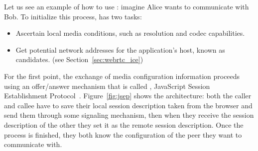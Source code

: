 Let us see an example of how to use \RTCPeerConnection: imagine Alice wants to communicate with Bob. To initialize this process, \RTCPeerConnection has two tasks:
\begin{itemize}
	\item Ascertain local media conditions, such as resolution and codec capabilities.
	\item Get potential network addresses for the application's host, known as candidates. (see Section~\ref{sec:webrtc_ice})
\end{itemize}

For the first point, the exchange of media configuration information proceeds using an offer/answer mechanism that is called \JSEP, JavaScript Session Establishment Protocol~\cite{jsep}. Figure~\ref{fig:jsep} shows the \JSEP architecture: both the caller and callee have to save their local session description taken from the browser and send them through some signaling mechanism, then when they receive the session description of the other they set it as the remote session description. Once the process is finished, they both know the configuration of the peer they want to communicate with.

